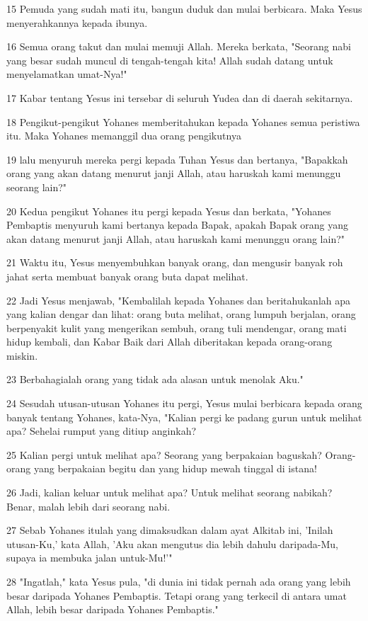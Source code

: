 \par 15 Pemuda yang sudah mati itu, bangun duduk dan mulai berbicara. Maka Yesus menyerahkannya kepada ibunya.
\par 16 Semua orang takut dan mulai memuji Allah. Mereka berkata, "Seorang nabi yang besar sudah muncul di tengah-tengah kita! Allah sudah datang untuk menyelamatkan umat-Nya!"
\par 17 Kabar tentang Yesus ini tersebar di seluruh Yudea dan di daerah sekitarnya.
\par 18 Pengikut-pengikut Yohanes memberitahukan kepada Yohanes semua peristiwa itu. Maka Yohanes memanggil dua orang pengikutnya
\par 19 lalu menyuruh mereka pergi kepada Tuhan Yesus dan bertanya, "Bapakkah orang yang akan datang menurut janji Allah, atau haruskah kami menunggu seorang lain?"
\par 20 Kedua pengikut Yohanes itu pergi kepada Yesus dan berkata, "Yohanes Pembaptis menyuruh kami bertanya kepada Bapak, apakah Bapak orang yang akan datang menurut janji Allah, atau haruskah kami menunggu orang lain?"
\par 21 Waktu itu, Yesus menyembuhkan banyak orang, dan mengusir banyak roh jahat serta membuat banyak orang buta dapat melihat.
\par 22 Jadi Yesus menjawab, "Kembalilah kepada Yohanes dan beritahukanlah apa yang kalian dengar dan lihat: orang buta melihat, orang lumpuh berjalan, orang berpenyakit kulit yang mengerikan sembuh, orang tuli mendengar, orang mati hidup kembali, dan Kabar Baik dari Allah diberitakan kepada orang-orang miskin.
\par 23 Berbahagialah orang yang tidak ada alasan untuk menolak Aku."
\par 24 Sesudah utusan-utusan Yohanes itu pergi, Yesus mulai berbicara kepada orang banyak tentang Yohanes, kata-Nya, "Kalian pergi ke padang gurun untuk melihat apa? Sehelai rumput yang ditiup anginkah?
\par 25 Kalian pergi untuk melihat apa? Seorang yang berpakaian baguskah? Orang-orang yang berpakaian begitu dan yang hidup mewah tinggal di istana!
\par 26 Jadi, kalian keluar untuk melihat apa? Untuk melihat seorang nabikah? Benar, malah lebih dari seorang nabi.
\par 27 Sebab Yohanes itulah yang dimaksudkan dalam ayat Alkitab ini, 'Inilah utusan-Ku,' kata Allah, 'Aku akan mengutus dia lebih dahulu daripada-Mu, supaya ia membuka jalan untuk-Mu!'"
\par 28 "Ingatlah," kata Yesus pula, "di dunia ini tidak pernah ada orang yang lebih besar daripada Yohanes Pembaptis. Tetapi orang yang terkecil di antara umat Allah, lebih besar daripada Yohanes Pembaptis."
